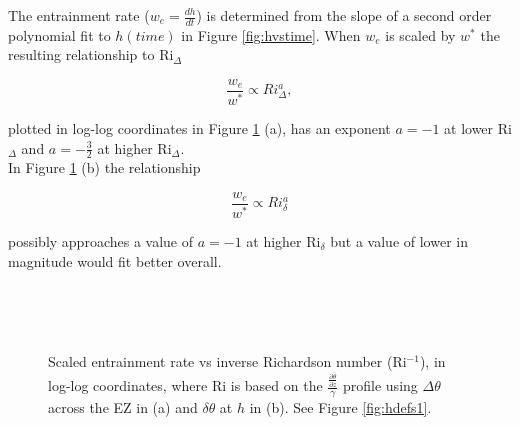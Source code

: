 \clearpage

The entrainment rate ($w_{e}= \frac{dh}{dt}$) is determined from the slope of a second order polynomial fit to $h(time)$ in Figure \ref{fig:hvstime}.  When $w_{e}$ is scaled by $w^{*}$ the resulting relationship to \acs{Ri}$_{\Delta}$  

\begin{equation}
\frac{w_{e}}{w^{*}} \propto Ri_{\Delta}^{a},
\end{equation}

plotted in log-log coordinates in Figure \ref{fig:weinvri} (a), has an exponent $a = -1$ at lower \acs{Ri}$_{\Delta}$ and $a = -\frac{3}{2}$ at higher \acs{Ri}$_{\Delta}$.\\

In Figure \ref{fig:weinvri} (b) the relationship

\begin{equation}
\frac{w_{e}}{w^{*}} \propto Ri_{\delta}^{a}
\end{equation}

possibly approaches a value of $a = -1$ at higher \acs{Ri}$_{\delta}$ but a value of lower in magnitude would fit better overall. \\    

\begin{figure}[htbp]
\begin{minipage}[b]{0.5\linewidth}
        \\
        \end{minipage}             
\quad
\begin{minipage}[b]{0.5\linewidth}
        \\       
       \end{minipage}
        \caption[Scaled entrainment rate vs inverse Richardson number]{Scaled entrainment rate vs inverse Richardson number (\acs{Ri}$^{-1}$), in log-log coordinates, where \acs{Ri} is based on the $\frac{\frac{\partial \overline{\theta}}{\partial z}}{\gamma}$ profile using $\Delta \theta$ across the \acs{EZ} in (a) and $\delta \theta$ at $h$ in (b). See Figure \ref{fig:hdefs1}.}
        \label{fig:weinvri}
\end{figure}

